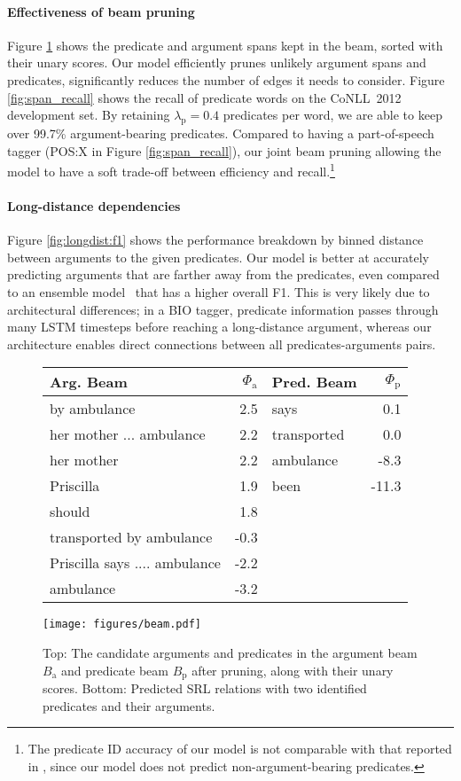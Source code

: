 \documentclass[11pt,a4paper]{article}
\begin{document}
\paragraph{Effectiveness of beam pruning}
Figure \ref{fig:beams} shows the predicate and argument spans kept in the beam, sorted with their unary scores.
Our model efficiently prunes unlikely argument spans and predicates, significantly reduces the number of edges it needs to consider. Figure \ref{fig:span_recall} shows the recall of predicate words on the CoNLL~2012 development set. By retaining $\lambda_{\text{p}} = 0.4$ predicates per word, we are able to keep over 99.7\% argument-bearing predicates. Compared to having a part-of-speech tagger (POS:X in Figure \ref{fig:span_recall}), our joint beam pruning allowing the model to have a soft trade-off between efficiency and recall.\footnote{The predicate ID accuracy of our model is not comparable with that reported in , since our model does not predict non-argument-bearing predicates.}


\paragraph{Long-distance dependencies}
Figure \ref{fig:longdist:f1} shows the performance breakdown by binned distance between arguments to the given predicates. Our model is better at accurately predicting arguments that are farther away from the predicates, even compared to an ensemble model~\cite{He2017DeepSR} that has a higher overall F1.
This is very likely due to architectural differences; in a BIO tagger, predicate information passes through many LSTM timesteps before reaching a long-distance argument, whereas our architecture enables direct connections between all predicates-arguments pairs.


\begin{figure}[t]
\centering
\footnotesize
\begin{tabularx}{\linewidth}{lrlr}
\toprule
Arg. Beam  &  $\Phi_{\text{a}}$  & Pred. Beam  & $\Phi_{\text{p}}$      \\
\midrule
by ambulance& 2.5& says& 0.1\\
her mother ... ambulance& 2.2& transported& 0.0\\
her mother& 2.2& ambulance&-8.3\\
Priscilla& 1.9& been&-11.3\\
should& 1.8&&  \\
transported by ambulance&-0.3&&\\
Priscilla says .... ambulance&-2.2&&\\
ambulance&-3.2&&\\    
\midrule
\end{tabularx}
\texttt{[image: figures/beam.pdf]}
\vspace{-1em}
\caption{Top: The candidate arguments and predicates in the argument beam $B_{\text{a}}$ and predicate beam $B_{\text{p}}$ after pruning, along with their unary scores. Bottom: Predicted SRL relations with two identified predicates and their arguments.}\label{fig:beams}
\end{figure} 
\end{document}

